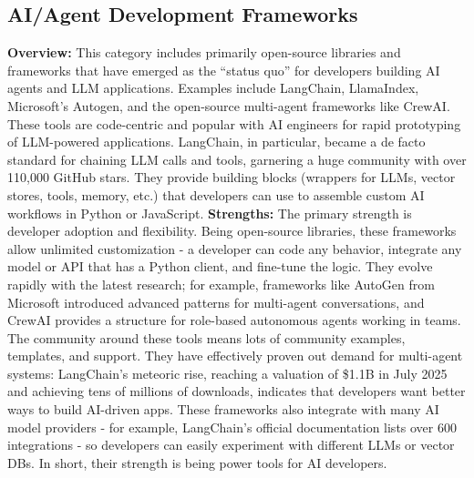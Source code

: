 \documentclass[11pt, a4paper, oneside]{article}
\begin{document}
\subsection{AI/Agent Development Frameworks}
\textbf{Overview:} This category includes primarily open-source libraries and frameworks that have emerged as the “status quo” for developers building AI agents and LLM applications. Examples include LangChain, LlamaIndex, Microsoft's Autogen, and the open-source multi-agent frameworks like CrewAI. These tools are code-centric and popular with AI engineers for rapid prototyping of LLM-powered applications. LangChain, in particular, became a de facto standard for chaining LLM calls and tools, garnering a huge community with over 110,000 GitHub stars\cite{langchainGitHub}. They provide building blocks (wrappers for LLMs, vector stores, tools, memory, etc.) that developers can use to assemble custom AI workflows in Python or JavaScript.
\newline\newline
\textbf{Strengths:} The primary strength is developer adoption and flexibility. Being open-source libraries, these frameworks allow unlimited customization - a developer can code any behavior, integrate any model or API that has a Python client, and fine-tune the logic. They evolve rapidly with the latest research; for example, frameworks like AutoGen from Microsoft introduced advanced patterns for multi-agent conversations\cite{autogenGitHub}, and CrewAI provides a structure for role-based autonomous agents working in teams\cite{crewaiGitHub}. The community around these tools means lots of community examples, templates, and support. They have effectively proven out demand for multi-agent systems: LangChain's meteoric rise, reaching a valuation of \$1.1B in July 2025\cite{langchainValuation} and achieving tens of millions of downloads, indicates that developers want better ways to build AI-driven apps. These frameworks also integrate with many AI model providers - for example, LangChain's official documentation lists over 600 integrations\cite{langchainIntegrations} - so developers can easily experiment with different LLMs or vector DBs. In short, their strength is being power tools for AI developers.
\newline\newline
\end{document}
